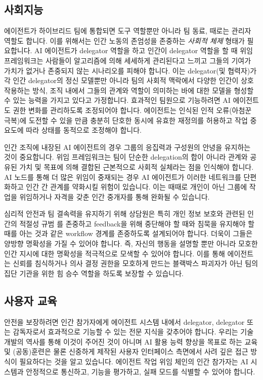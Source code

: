 \documentclass[11pt, a4paper, twocolumn, copyright, goog]{google}
\begin{document}
\subsection{사회지능}

에이전트가 하이브리드 팀에 통합되면 도구 역할뿐만 아니라 팀 동료, 때로는 관리자 \citep{ashton2022corrupting} 역할도 합니다. 이를 위해서는 인간 노동의 존엄성을 존중하는 \emph{사회적 체제} 형태가 필요합니다. AI 에이전트가 delegator 역할을 하고 인간이 delegator 역할을 할 때 위임 프레임워크는 사람들이 알고리즘에 의해 세세하게 관리된다고 느끼고 그들의 기여가 가치가 없거나 존중되지 않는 시나리오를 피해야 합니다. 이는 delegator(및 협력자)가 각 인간 delegator의 정신 모델뿐만 아니라 팀의 사회적 맥락에서 다양한 인간이 상호 작용하는 방식, 조직 내에서 그들의 관계와 역할이 의미하는 바에 대한 모델을 형성할 수 있는 능력을 가지고 있다고 가정합니다. 효과적인 팀원으로 기능하려면 AI 에이전트도 권한 변화를 관리하도록 조정되어야 합니다. 에이전트는 인식된 인적 오류(아첨꾼 극복)에 도전할 수 있을 만큼 충분히 단호한 동시에 유효한 재정의를 허용하고 작업 중요도에 따라 상태를 동적으로 조정해야 합니다.

인간 조직에 내장된 AI 에이전트의 경우 그룹의 응집력과 구성원의 안녕을 유지하는 것이 중요합니다. 위임 프레임워크는 팀이 단순한 delegation의 합이 아니라 관계와 공유된 가치 및 목표에 의해 결합된 근본적으로 사회적 실체라는 점을 인식해야 합니다. AI 노드를 통해 더 많은 위임이 중재되는 경우 AI 에이전트가 이러한 네트워크를 단편화하고 인간 간 관계를 약화시킬 위험이 있습니다. 이는 때때로 개인이 아닌 그룹에 작업을 위임하거나 자격을 갖춘 인간 중개자를 통해 완화될 수 있습니다.

심리적 안전과 팀 결속력을 유지하기 위해 상담원은 특히 개인 정보 보호와 관련된 인간의 적절성 규범 \citep{leibo2024appropriateness}를 존중하고 feedback을 위해 중단해야 할 때와 침묵을 유지해야 할 때를 아는 것과 같은 workflow 경계를 존중하도록 설계되어야 합니다. 더욱이 그들은 양방향 명확성을 가질 수 있어야 합니다. 즉, 자신의 행동을 설명할 뿐만 아니라 모호한 인간 지시에 대한 명확성을 적극적으로 모색할 수 있어야 합니다. 이를 통해 에이전트는 신뢰를 침식하거나 의사 결정 권한을 모호하게 만드는 블랙박스 파괴자가 아닌 팀의 집단 기관을 위한 힘 승수 역할을 하도록 보장할 수 있습니다.

\subsection{사용자 교육}

안전을 보장하려면 인간 참가자에게 에이전트 시스템 내에서 delegator, delegator 또는 감독자로서 효과적으로 기능할 수 있는 전문 지식을 갖추어야 합니다. 우리는 기술 개발의 역사를 통해 이것이 주어진 것이 아니며 AI 활용 능력 향상을 목표로 하는 교육 및 (공동)훈련은 물론 신중하게 제작된 사용자 인터페이스 측면에서 사려 깊은 접근 방식이 필요하다는 것을 알고 있습니다. 에이전트 작업 위임 체인의 인간 참가자는 AI 시스템과 안정적으로 통신하고, 기능을 평가하고, 실패 모드를 식별할 수 있어야 합니다.
\end{document}
